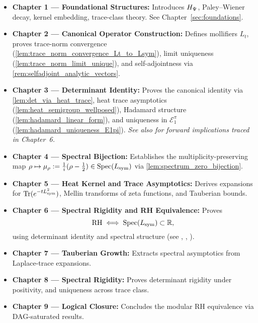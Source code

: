 \begin{itemize}
  \item \textbf{Chapter 1 — Foundational Structures:}  
  Introduces \( H_{\Psi} \), Paley–Wiener decay, kernel embedding, trace-class theory. See Chapter~\ref{sec:foundations}.

  \item \textbf{Chapter 2 — Canonical Operator Construction:}  
  Defines mollifiers \( L_t \), proves trace-norm convergence (\cref{lem:trace_norm_convergence_Lt_to_Lsym}), limit uniqueness (\cref{lem:trace_norm_limit_unique}), and self-adjointness via \cref{rem:selfadjoint_analytic_vectors}.

  \item \textbf{Chapter 3 — Determinant Identity:}  
  Proves the canonical identity via \cref{lem:det_via_heat_trace}, heat trace asymptotics (\cref{lem:heat_semigroup_wellposed}), Hadamard structure (\cref{lem:hadamard_linear_form}), and uniqueness in \( \mathcal{E}_1^\pi \) (\cref{lem:hadamard_uniqueness_E1pi}).  
  \textit{See also  for forward implications traced in Chapter~6.}

  \item \textbf{Chapter 4 — Spectral Bijection:}  
  Establishes the multiplicity-preserving map \( \rho \mapsto \mu_\rho := \tfrac{1}{i}(\rho - \tfrac{1}{2}) \in \operatorname{Spec}(L_{\mathrm{sym}}) \) via \cref{lem:spectrum_zero_bijection}.

  \item \textbf{Chapter 5 — Heat Kernel and Trace Asymptotics:}  
  Derives expansions for \( \operatorname{Tr}(e^{-tL_{\mathrm{sym}}^2}) \), Mellin transforms of zeta functions, and Tauberian bounds.

  \item \textbf{Chapter 6 — Spectral Rigidity and RH Equivalence:}  
  Proves
  \[
  \mathrm{RH} \iff \operatorname{Spec}(L_{\mathrm{sym}}) \subset \mathbb{R},
  \]
  using determinant identity and spectral structure (see , , ).

  \item \textbf{Chapter 7 — Tauberian Growth:}  
  Extracts spectral asymptotics from Laplace-trace expansions.

  \item \textbf{Chapter 8 — Spectral Rigidity:}  
  Proves determinant rigidity under positivity, and uniqueness across trace class.

  \item \textbf{Chapter 9 — Logical Closure:}  
  Concludes the modular RH equivalence via DAG-saturated results.
\end{itemize}

